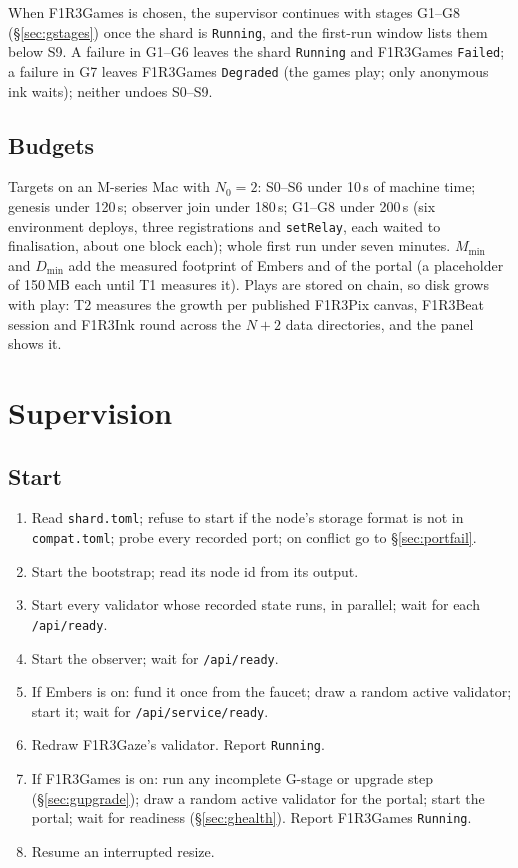 \documentclass[11pt]{article}
\theoremstyle{definition}
\theoremstyle{remark}
\newcommand{\code}[1]{\texttt{#1}}
\newcommand{\Gz}{F1R3Gaze}
\newcommand{\Gm}{F1R3Games}
\newcommand{\Em}{Embers}
\begin{document}
\noindent
When \Gm{} is chosen, the supervisor continues with stages G1--G8
(\S\ref{sec:gstages}) once the shard is \code{Running}, and the first-run window lists
them below S9. A failure in G1--G6 leaves the shard \code{Running} and \Gm{}
\code{Failed}; a failure in G7 leaves \Gm{} \code{Degraded} (the games play; only
anonymous ink waits); neither undoes S0--S9.

\subsection{Budgets}\label{sec:budget}

Targets on an M-series Mac with $N_0 = 2$: S0--S6 under 10\,s of machine time; genesis
under 120\,s; observer join under 180\,s; G1--G8 under 200\,s (six environment
deploys, three registrations and \code{setRelay}, each waited to finalisation, about
one block each);
whole first run under seven minutes. $M_{\min}$ and $D_{\min}$ add the measured
footprint of \Em{} and of the portal (a placeholder of 150\,MB each until T1 measures
it). Plays are stored on chain, so disk grows with play: T2 measures the growth per
published F1R3Pix canvas, F1R3Beat session and F1R3Ink round across the $N+2$ data
directories, and the panel shows it.

\section{Supervision}\label{sec:supervise}

\subsection{Start}\label{sec:start}
\begin{enumerate}[nosep]
\item Read \code{shard.toml}; refuse to start if the node's storage format is not in
  \code{compat.toml}; probe every recorded port; on conflict go to
  \S\ref{sec:portfail}.
\item Start the bootstrap; read its node id from its output.
\item Start every validator whose recorded state runs, in parallel; wait for each
  \code{/api/ready}.
\item Start the observer; wait for \code{/api/ready}.
\item If \Em{} is on: fund it once from the faucet; draw a random active validator;
  start it; wait for \code{/api/service/ready}.
\item Redraw \Gz{}'s validator. Report \code{Running}.
\item If \Gm{} is on: run any incomplete G-stage or upgrade step
  (\S\ref{sec:gupgrade}); draw a random active validator for the portal; start the
  portal; wait for readiness (\S\ref{sec:ghealth}). Report \Gm{} \code{Running}.
\item Resume an interrupted resize.
\end{enumerate}
\end{document}
